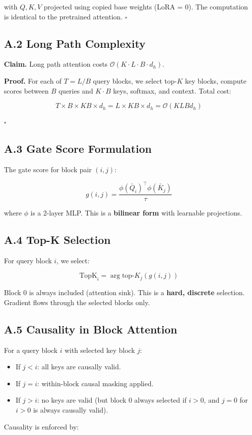 with $Q, K, V$ projected using copied base weights (LoRA = 0). The 
computation is identical to the pretrained attention. $\square$

\subsection{A.2 Long Path Complexity}

\textbf{Claim.} Long path attention costs $\mathcal{O}(K \cdot L \cdot B \cdot d_h)$.

\textbf{Proof.} For each of $T = L/B$ query blocks, we select top-$K$ key 
blocks, compute scores between $B$ queries and $K \cdot B$ keys, softmax, 
and context. Total cost:

\[
T \times B \times K B \times d_h = L \times K B \times d_h = \mathcal{O}(K L B d_h)
\tag{A.2}
\]

$\square$

\subsection{A.3 Gate Score Formulation}

The gate score for block pair $(i, j)$:

\[
g(i, j) = \frac{\phi(\bar{Q}_i)^\top \phi(\bar{K}_j)}{\tau}
\tag{A.3}
\]

where $\phi$ is a 2-layer MLP. This is a \textbf{bilinear form} with learnable 
projections.

\subsection{A.4 Top-K Selection}

For query block $i$, we select:

\[
\text{TopK}_i = \arg\text{top-}K_j (g(i, j))
\tag{A.4}
\]

Block 0 is always included (attention sink). This is a \textbf{hard, discrete} 
selection. Gradient flows through the selected blocks only.

\subsection{A.5 Causality in Block Attention}

For a query block $i$ with selected key block $j$:

\begin{itemize}
\item If $j < i$: all keys are causally valid.
\item If $j = i$: within-block causal masking applied.
\item If $j > i$: no keys are valid (but block 0 always selected if $i > 0$,
  and $j = 0$ for $i > 0$ is always causally valid).

\end{itemize}
Causality is enforced by:

